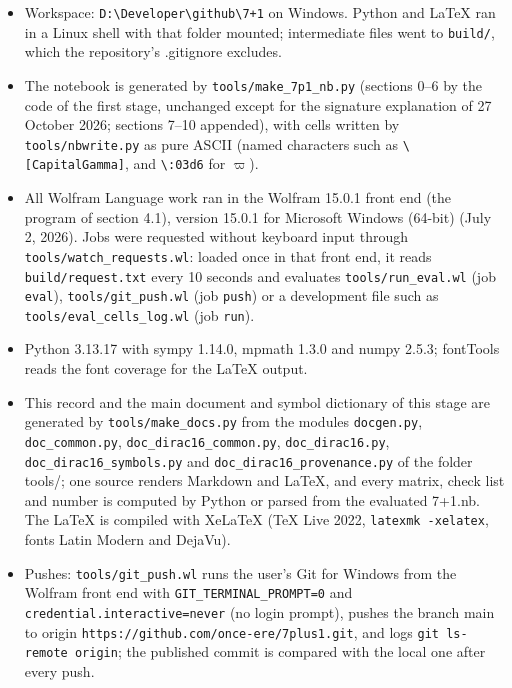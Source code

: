 \documentclass[10pt,a4paper]{article}
\begin{document}
\begin{itemize}
\item Workspace: \texttt{D:\textbackslash{}\allowbreak{}Developer\textbackslash{}\allowbreak{}github\textbackslash{}\allowbreak{}7+1} on Windows. Python and LaTeX ran in a Linux shell with that folder mounted; intermediate files went to \texttt{build/\allowbreak{}}, which the repository’s .gitignore excludes.
\item The notebook is generated by \texttt{tools/\allowbreak{}make\_\allowbreak{}7p1\_\allowbreak{}nb.py} (sections 0–6 by the code of the first stage, unchanged except for the signature explanation of 27 October 2026; sections 7–10 appended), with cells written by \texttt{tools/\allowbreak{}nbwrite.py} as pure ASCII (named characters such as \texttt{\textbackslash{}\allowbreak{}[CapitalGamma]}, and \texttt{\textbackslash{}\allowbreak{}:03d6} for $\varpi$).
\item All Wolfram Language work ran in the Wolfram 15.0.1 front end (the program of section 4.1), version 15.0.1 for Microsoft Windows (64-bit) (July 2, 2026). Jobs were requested without keyboard input through \texttt{tools/\allowbreak{}watch\_\allowbreak{}requests.wl}: loaded once in that front end, it reads \texttt{build/\allowbreak{}request.txt} every 10 seconds and evaluates \texttt{tools/\allowbreak{}run\_\allowbreak{}eval.wl} (job \texttt{eval}), \texttt{tools/\allowbreak{}git\_\allowbreak{}push.wl} (job \texttt{push}) or a development file such as \texttt{tools/\allowbreak{}eval\_\allowbreak{}cells\_\allowbreak{}log.wl} (job \texttt{run}).
\item Python 3.13.17 with sympy 1.14.0, mpmath 1.3.0 and numpy 2.5.3; fontTools reads the font coverage for the LaTeX output.
\item This record and the main document and symbol dictionary of this stage are generated by \texttt{tools/\allowbreak{}make\_\allowbreak{}docs.py} from the modules \texttt{docgen.py}, \texttt{doc\_\allowbreak{}common.py}, \texttt{doc\_\allowbreak{}dirac16\_\allowbreak{}common.py}, \texttt{doc\_\allowbreak{}dirac16.py}, \texttt{doc\_\allowbreak{}dirac16\_\allowbreak{}symbols.py} and \texttt{doc\_\allowbreak{}dirac16\_\allowbreak{}provenance.py} of the folder tools/; one source renders Markdown and LaTeX, and every matrix, check list and number is computed by Python or parsed from the evaluated 7+1.nb. The LaTeX is compiled with XeLaTeX (TeX Live 2022, \texttt{latexmk -xelatex}, fonts Latin Modern and DejaVu).
\item Pushes: \texttt{tools/\allowbreak{}git\_\allowbreak{}push.wl} runs the user’s Git for Windows from the Wolfram front end with \texttt{GIT\_\allowbreak{}TERMINAL\_\allowbreak{}PROMPT=0} and \texttt{credential.interactive=never} (no login prompt), pushes the branch main to origin \texttt{https:/\allowbreak{}/\allowbreak{}github.com/\allowbreak{}once-ere/\allowbreak{}7plus1.git}, and logs \texttt{git ls-remote origin}; the published commit is compared with the local one after every push.

\end{itemize}
\end{document}

